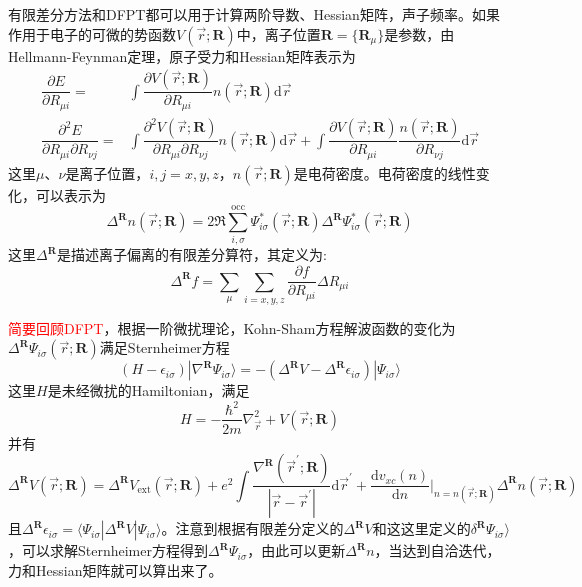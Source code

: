 有限差分方法和\textrm{DFPT}都可以用于计算两阶导数、\textrm{Hessian}矩阵，声子频率。如果作用于电子的可微的势函数$V(\vec r;\mathbf{R})$中，离子位置$\mathbf{R}=\{\mathbf{R}_{\mu}\}$是参数，由\textrm{Hellmann-Feynman}定理，原子受力和\textrm{Hessian}矩阵表示为
\begin{displaymath}
	\begin{aligned}
		\dfrac{\partial E}{\partial R_{\mu i}}=&\int\dfrac{\partial V(\vec r;\mathbf{R})}{\partial R_{\mu i}}n(\vec r;\mathbf{R})\mathrm{d}\vec r \\
		\dfrac{\partial^2E}{\partial R_{\mu i}\partial R_{\nu j}}=&\int\dfrac{\partial^2V(\vec r;\mathbf{R})}{\partial R_{\mu i}\partial R_{\nu j}}n(\vec r;\mathbf{R})\mathrm{d}\vec r + \int\dfrac{\partial V(\vec r;\mathbf{R})}{\partial R_{\mu i}}\dfrac{n(\vec r;\mathbf{R})}{\partial R_{\nu j}}\mathrm{d}\vec r
	\end{aligned}
\end{displaymath}
这里$\mu$、$\nu$是离子位置，$i,j=x,y,z$，$n(\vec r;\mathbf{R})$是电荷密度。电荷密度的线性变化，可以表示为
\begin{displaymath}
	\Delta^{\mathbf{R}}n(\vec r;\mathbf{R})=2\Re\sum_{i,\sigma}^{\mathrm{occ}}\Psi^{\ast}_{i\sigma}(\vec r;\mathbf{R})\Delta^{\mathbf{R}}\Psi^{\ast}_{i\sigma}(\vec r;\mathbf{R})
\end{displaymath}
这里$\Delta^{\mathbf{R}}$是描述离子偏离的有限差分算符，其定义为:
\begin{displaymath}
	\Delta^{\mathbf{R}}f=\sum_{\mu}\sum_{i=x,y,z}\dfrac{\partial f}{\partial R_{\mu i}}\Delta R_{\mu i}
\end{displaymath}

\textcolor{red}{简要回顾\textrm{DFPT}}，根据一阶微扰理论，\textrm{Kohn-Sham}方程解波函数的变化为$\Delta^{\mathbf{R}}\Psi_{i\sigma}(\vec r;\mathbf{R})$满足\textrm{Sternheimer}方程
\begin{displaymath}
	
	(H-\epsilon_{i\sigma})|\nabla^{\mathbf{R}}\Psi_{i\sigma}\rangle=-(\Delta^{\mathbf{R}}V-\Delta^{\mathbf{R}}\epsilon_{i\sigma})|\Psi_{i\sigma}\rangle
\end{displaymath}
这里$H$是未经微扰的\textrm{Hamiltonian}，满足
\begin{displaymath}
	H=-\dfrac{\hbar^2}{2m}\nabla_{\vec r}^2 + V(\vec r;\mathbf{R})
\end{displaymath}
并有
\begin{displaymath}
	\Delta^{\mathbf{R}}V(\vec r;\mathbf{R})=\Delta^{\mathbf{R}}V_{\mathrm{ext}}(\vec r;\mathbf{R})+e^2\int\dfrac{\nabla^{\mathbf{R}}(\vec r^{\prime};\mathbf{R})}{|\vec r-\vec r^{\prime}|}\mathrm{d}\vec r^{\prime}+\dfrac{\mathrm{d}v_{xc}(n)}{\mathrm{d}n}\bigg|_{n=n(\vec r;\mathbf{R})}\Delta^{\mathbf{R}}n(\vec r;\mathbf{R})
\end{displaymath}
且$\Delta^{\mathbf{R}}\epsilon_{i\sigma}=\langle\Psi_{i\sigma}|\Delta^{\mathbf{R}}V|\Psi_{i\sigma}\rangle$。注意到根据有限差分定义的$\Delta^{\mathbf{R}}V$和这这里定义的$\delta^{\mathbf{R}}\Psi_{i\sigma}\rangle$，可以求解\textrm{Sternheimer}方程得到$\Delta^{\mathbf{R}}\Psi_{i\sigma}$，由此可以更新$\Delta^{\mathbf{R}}n$，当达到自洽迭代，力和\textrm{Hessian}矩阵就可以算出来了。

